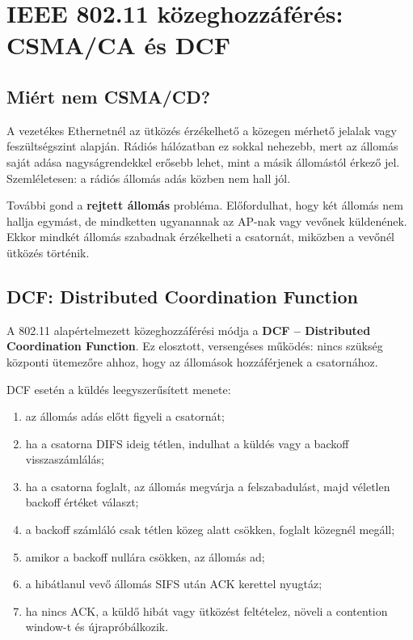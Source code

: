 \begin{center}

\end{center}

\section{IEEE 802.11 közeghozzáférés: CSMA/CA és DCF}

\subsection{Miért nem CSMA/CD?}

A vezetékes Ethernetnél az ütközés érzékelhető a közegen mérhető jelalak vagy feszültségszint alapján. Rádiós hálózatban ez sokkal nehezebb, mert az állomás saját adása nagyságrendekkel erősebb lehet, mint a másik állomástól érkező jel. Szemléletesen: a rádiós állomás adás közben nem hall jól.

További gond a \textbf{rejtett állomás} probléma. Előfordulhat, hogy két állomás nem hallja egymást, de mindketten ugyanannak az AP-nak vagy vevőnek küldenének. Ekkor mindkét állomás szabadnak érzékelheti a csatornát, miközben a vevőnél ütközés történik.

\subsection{DCF: Distributed Coordination Function}

A 802.11 alapértelmezett közeghozzáférési módja a \textbf{DCF -- Distributed Coordination Function}. Ez elosztott, versengéses működés: nincs szükség központi ütemezőre ahhoz, hogy az állomások hozzáférjenek a csatornához.

DCF esetén a küldés leegyszerűsített menete:

\begin{enumerate}
  \item az állomás adás előtt figyeli a csatornát;
  \item ha a csatorna DIFS ideig tétlen, indulhat a küldés vagy a backoff visszaszámlálás;
  \item ha a csatorna foglalt, az állomás megvárja a felszabadulást, majd véletlen backoff értéket választ;
  \item a backoff számláló csak tétlen közeg alatt csökken, foglalt közegnél megáll;
  \item amikor a backoff nullára csökken, az állomás ad;
  \item a hibátlanul vevő állomás SIFS után ACK kerettel nyugtáz;
  \item ha nincs ACK, a küldő hibát vagy ütközést feltételez, növeli a contention window-t és újrapróbálkozik.
\end{enumerate}

